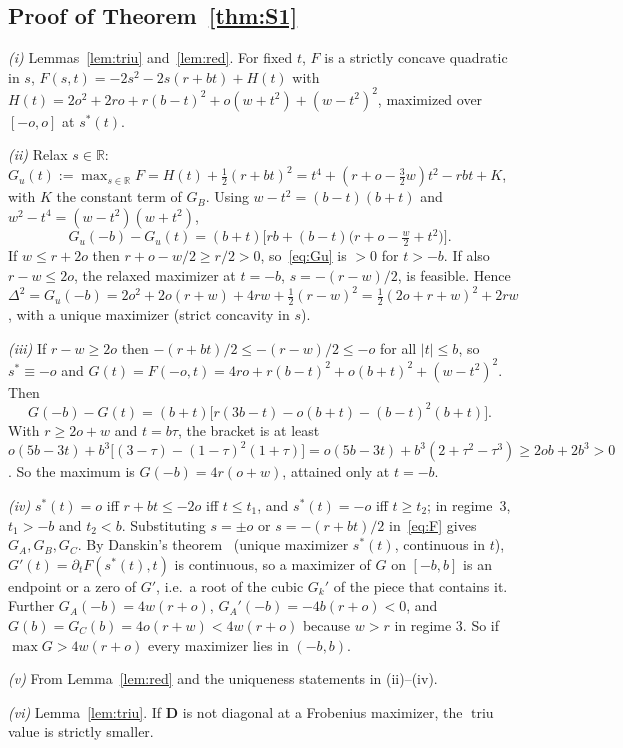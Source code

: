 \documentclass[11pt]{article}
\theoremstyle{definition}
\theoremstyle{plain}
\DeclareMathOperator{\triu}{triu}
\newcommand{\R}{\mathbb{R}}
\newcommand{\bD}{\mathbf{D}}
\begin{document}
\subsection{Proof of Theorem~\ref{thm:S1}}

\emph{(i)} Lemmas~\ref{lem:triu} and~\ref{lem:red}. For fixed $t$, $F$ is a strictly concave quadratic in $s$, $F(s,t)=-2s^2-2s(r+bt)+H(t)$ with $H(t)=2o^2+2ro+r(b-t)^2+o(w+t^2)+(w-t^2)^2$, maximized over $[-o,o]$ at $s^*(t)$.

\emph{(ii)} Relax $s\in\R$: $G_u(t):=\max_{s\in\R}F=H(t)+\tfrac12(r+bt)^2=t^4+(r+o-\tfrac32w)t^2-rbt+K$, with $K$ the constant term of $G_B$. Using $w-t^2=(b-t)(b+t)$ and $w^2-t^4=(w-t^2)(w+t^2)$,
\begin{equation}
  G_u(-b)-G_u(t)=(b+t)\bigl[rb+(b-t)\bigl(r+o-\tfrac w2+t^2\bigr)\bigr].
  \label{eq:Gu}
\end{equation}
If $w\le r+2o$ then $r+o-w/2\ge r/2>0$, so~\eqref{eq:Gu} is $>0$ for $t>-b$. If also $r-w\le2o$, the relaxed maximizer at $t=-b$, $s=-(r-w)/2$, is feasible. Hence $\Delta^2=G_u(-b)=2o^2+2o(r+w)+4rw+\tfrac12(r-w)^2=\tfrac12(2o+r+w)^2+2rw$, with a unique maximizer (strict concavity in $s$).

\emph{(iii)} If $r-w\ge2o$ then $-(r+bt)/2\le-(r-w)/2\le-o$ for all $|t|\le b$, so $s^*\equiv-o$ and $G(t)=F(-o,t)=4ro+r(b-t)^2+o(b+t)^2+(w-t^2)^2$. Then
\[
  G(-b)-G(t)=(b+t)\bigl[r(3b-t)-o(b+t)-(b-t)^2(b+t)\bigr].
\]
With $r\ge2o+w$ and $t=b\tau$, the bracket is at least $o(5b-3t)+b^3\bigl[(3-\tau)-(1-\tau)^2(1+\tau)\bigr]=o(5b-3t)+b^3(2+\tau^2-\tau^3)\ge2ob+2b^3>0$. So the maximum is $G(-b)=4r(o+w)$, attained only at $t=-b$.

\emph{(iv)} $s^*(t)=o$ iff $r+bt\le-2o$ iff $t\le t_1$, and $s^*(t)=-o$ iff $t\ge t_2$; in regime~3, $t_1>-b$ and $t_2<b$. Substituting $s=\pm o$ or $s=-(r+bt)/2$ in~\eqref{eq:F} gives $G_A,G_B,G_C$. By Danskin's theorem~\cite{Danskin66} (unique maximizer $s^*(t)$, continuous in $t$), $G'(t)=\partial_tF(s^*(t),t)$ is continuous, so a maximizer of $G$ on $[-b,b]$ is an endpoint or a zero of $G'$, i.e.\ a root of the cubic $G_k'$ of the piece that contains it. Further $G_A(-b)=4w(r+o)$, $G_A'(-b)=-4b(r+o)<0$, and $G(b)=G_C(b)=4o(r+w)<4w(r+o)$ because $w>r$ in regime 3. So if $\max G>4w(r+o)$ every maximizer lies in $(-b,b)$.

\emph{(v)} From Lemma~\ref{lem:red} and the uniqueness statements in (ii)--(iv).

\emph{(vi)} Lemma~\ref{lem:triu}. If $\bD$ is not diagonal at a Frobenius maximizer, the $\triu$ value is strictly smaller.
\end{document}
